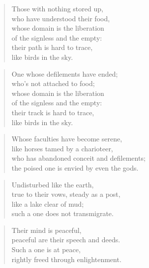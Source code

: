 \documentclass[12pt,openany]{book}%
\begin{document}
\begin{verse}%
Those with nothing stored up, \\
who have understood their food, \\
whose domain is the liberation \\
of the signless and the empty: \\
their path is hard to trace, \\
like birds in the sky. 

%
\end{verse}

\begin{verse}%
One whose defilements have ended; \\
who’s not attached to food; \\
whose domain is the liberation \\
of the signless and the empty: \\
their track is hard to trace, \\
like birds in the sky. 

%
\end{verse}

\begin{verse}%
Whose faculties have become serene, \\
like horses tamed by a charioteer, \\
who has abandoned conceit and defilements; \\
the poised one is envied by even the gods. 

%
\end{verse}

\begin{verse}%
Undisturbed like the earth, \\
true to their vows, steady as a post, \\
like a lake clear of mud; \\
such a one does not transmigrate. 

%
\end{verse}

\begin{verse}%
Their mind is peaceful, \\
peaceful are their speech and deeds. \\
Such a one is at peace, \\
rightly freed through enlightenment. 

%
\end{verse}
\end{document}

